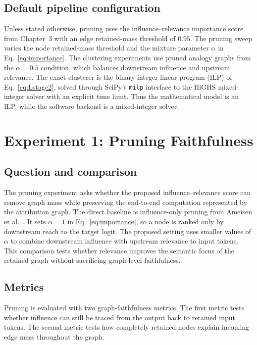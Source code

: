 \documentclass[../main.tex]{subfiles}
\begin{document}
\subsection{Default pipeline configuration}

Unless stated otherwise, pruning uses the influence--relevance importance score
from Chapter~3 with an edge retained-mass threshold of $0.95$. The pruning sweep
varies the node retained-mass threshold and the mixture parameter $\alpha$ in
Eq.~\eqref{eq:importance}. The clustering experiments use pruned analogy graphs
from the $\alpha=0.5$ condition, which balances downstream influence and
upstream relevance. The exact clusterer is the binary integer linear program
(ILP) of Eq.~\eqref{eq:Lstage2}, solved through SciPy's \texttt{milp} interface
to the HiGHS mixed-integer solver with an explicit time limit. Thus the
mathematical model is an ILP, while the software backend is a mixed-integer
solver.

\section{Experiment 1: Pruning Faithfulness}
\label{sec:pruning-experiment}
\label{sec:eval-method}

\subsection{Question and comparison}

The pruning experiment asks whether the proposed influence--relevance score can
remove graph mass while preserving the end-to-end computation represented by the
attribution graph. The direct baseline is influence-only pruning from Ameisen et
al.~\cite{ameisen2025circuit}. It sets $\alpha=1$ in Eq.~\eqref{eq:importance},
so a node is ranked only by downstream reach to the target logit. The proposed
setting uses smaller values of $\alpha$ to combine downstream influence with
upstream relevance to input tokens. This comparison tests whether relevance
improves the semantic focus of the retained graph without sacrificing graph-level
faithfulness.

\subsection{Metrics}

Pruning is evaluated with two graph-faithfulness metrics. The first metric tests
whether influence can still be traced from the output back to retained input
tokens. The second metric tests how completely retained nodes explain incoming
edge mass throughout the graph.
\end{document}

